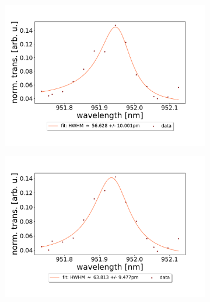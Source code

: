 \begin{figure}[h!]
\begin{subfigure}[b]{0.49\textwidth}
        \includegraphics[width=\textwidth]{figures/results/double fano fits/20250326/21um_M3:M5_fit_11.pdf}
        \caption{}
        \label{fig:21um_M3:M5_fit_11}
    \end{subfigure}
    \begin{subfigure}[b]{0.49\textwidth}
        \includegraphics[width=\textwidth]{figures/results/double fano fits/20250326/21um_M3:M5_fit_12.pdf}
        \caption{}
        \label{fig:21um_M3:M5_fit_12}
    \end{subfigure}
\end{figure}
